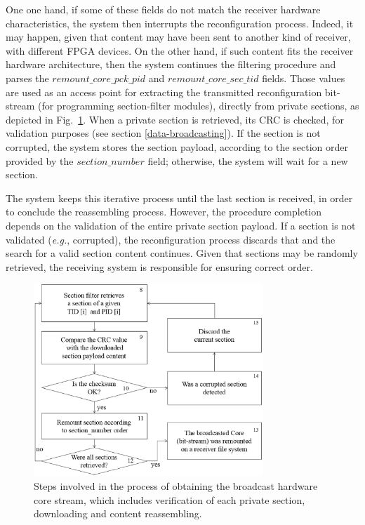 One one hand, if some of these fields do not match the receiver hardware characteristics, the system then interrupts the reconfiguration process. Indeed, it may happen, given that content may have been sent to another kind of receiver, with different FPGA devices. On the other hand, if such content fits the receiver hardware architecture, then the system continues the filtering procedure and parses the $remount\_core\_pck\_pid$ and $remount\_core\_sec\_tid$ fields. Those values are used as an access point for extracting the transmitted reconfiguration bit-stream (for programming section-filter modules), directly from private sections, as depicted in Fig.~\ref{figure:fig7}. When a private section is retrieved, its CRC is checked, for validation purposes (see section \ref{data-broadcasting}). If the section is not corrupted, the system stores the section payload, according to the section order provided by the $section\_number$ field; otherwise, the system will wait for a new section.

The system keeps this iterative process until the last section is received, in order to conclude the reassembling process. However, the procedure completion depends on the validation of the entire private section payload. If a section is not validated ({\em e.g.}, corrupted), the reconfiguration process discards that and the search for a valid section content continues. Given that sections may be randomly retrieved, the receiving system is responsible for ensuring correct order.

%
\begin{figure}[hbt]
\centering
\includegraphics[width=3.4in]{images/Fig7.eps}
\caption{Steps involved in the process of obtaining the broadcast hardware core stream, which includes verification of each private section, downloading and content reassembling.}
\label{figure:fig7}
\end{figure}
%

